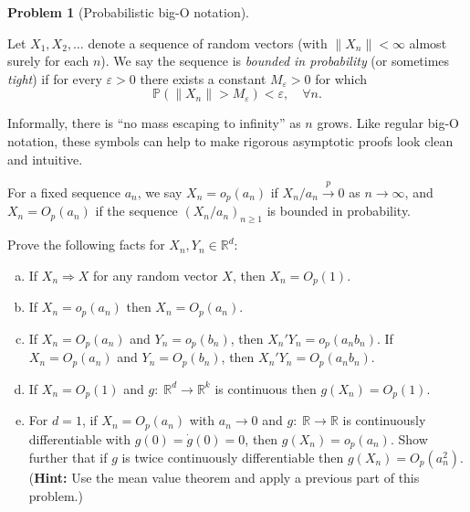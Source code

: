 \documentclass{article}
\newcommand{\PP}{\mathbb{P}}
\newcommand{\RR}{\mathbb{R}}
\newcommand{\toProb}{\overset{p}{\to}}
\newcommand{\ep}{\varepsilon}
\theoremstyle{definition}
\newtheorem{problem}{Problem}
\begin{document}
\begin{problem}[Probabilistic big-O notation]
\label{prob:bigO}

Let $X_1,X_2,\ldots$ denote a sequence of random vectors (with $\|X_n\| <\infty$ almost surely for each $n$). We say the sequence is {\em bounded in probability} (or sometimes {\em tight}) if for every $\ep>0$ there exists a constant $M_\ep > 0$ for which
\[
\PP(\|X_n\| > M_\ep) < \ep, \quad \forall n.
\]

Informally, there is ``no mass escaping to infinity'' as $n$ grows. Like regular big-O notation, these symbols can help to make rigorous asymptotic proofs look clean and intuitive.

For a fixed sequence $a_n$, we say $X_n = o_p(a_n)$ if $X_n/a_n \toProb 0$ as $n\to \infty$, and $X_n = O_p(a_n)$ if the sequence $(X_n/a_n)_{n\geq 1}$ is bounded in probability.

Prove the following facts for $X_n, Y_n \in \RR^d$:

\begin{enumerate}[(a)]
\item If $X_n \Rightarrow X$ for any random vector $X$, then $X_n = O_p(1)$.


\item If $X_n = o_p(a_n)$ then $X_n = O_p(a_n)$.




% 



% 



\item If $X_n = O_p(a_n)$ and $Y_n = o_p(b_n)$, then $X_n'Y_n = o_p(a_n b_n)$. If $X_n = O_p(a_n)$ and $Y_n = O_p(b_n)$, then $X_n'Y_n = O_p(a_n b_n)$.



\item If $X_n = O_p(1)$ and $g:\; \RR^d \to \RR^k$ is continuous then $g(X_n) = O_p(1)$.



\item For $d=1$, if $X_n = O_p(a_n)$ with $a_n \to 0$ and $g:\; \RR \to \RR$ is continuously differentiable with $g(0) = \dot{g}(0) = 0$, then $g(X_n) = o_p(a_n)$. Show further that if $g$ is twice continuously differentiable then $g(X_n) = O_p(a_n^2)$. ({\bf Hint:} Use the mean value theorem and apply a previous part of this problem.)




\end{enumerate}
\end{problem}
\end{document}
